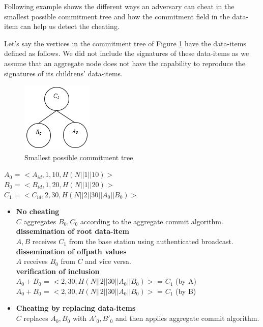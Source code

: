 	Following example shows the different ways an adversary can cheat in the smallest possible commitment tree and how the commitment field in the data-item can help us detect the cheating.
\begin{exmp}
	\label{ex1:cheating}
	Let's say the vertices in the commitment tree of Figure \ref{fig:cheating} have the data-items defined as follows.
	We did not include the signatures of these data-items as we assume that an aggregate node does not have the capability to reproduce the signatures of its childrens' data-items.\\
	\begin{figure}[t]
		\centering
		\includegraphics{images/commitment-tree-2.png}
		\caption{Smallest possible commitment tree}
		\label{fig:cheating}
	\end{figure}	
	$A_{0}$ = $<A_{id},1,10, H(N||1||10)>$\\
	$B_{0}$ = $<B_{id},1,20, H(N||1||20)>$\\
	$C_{1}$ = $<C_{id},2,30, H(N||2||30||A_{0}||B_{0})>$
	\begin{itemize}
	\item \textbf{No cheating}\\
		$C$ aggregates $B_{0},C_{0}$ according to the aggregate commit algorithm.\\
		\textbf{dissemination of root data-item}\\
			$A,B$ receives $C_{1}$ from the base station using authenticated broadcast.\\
		\textbf{dissemination of offpath values}\\
			$A$ receives $B_{0}$ from $C$ and vice versa.\\
		\textbf{verification of inclusion}\\
			$A_{0} + B_{0}$ = $<2,30,H(N||2||30||A_{0}||B_{0})>$ = $C_{1}$ (by A)\\
			$A_{0} + B_{0}$ = $<2,30,H(N||2||30||A_{0}||B_{0})>$ = $C_{1}$ (by B)
	\item \textbf{Cheating by replacing data-items}\\
		$C$ replaces $A_{0},B_{0}$ with $A'_{0},B'_{0}$ and then applies aggregate commit algorithm.\\

\end{itemize}
\end{exmp}
